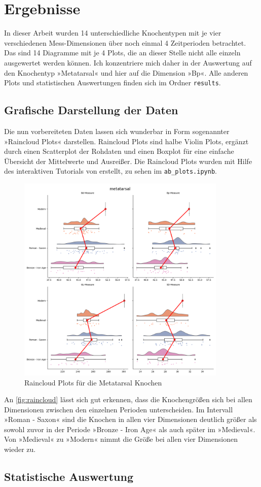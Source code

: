 \section{Ergebnisse}
In dieser Arbeit wurden 14 unterschiedliche Knochentypen mit je vier verschiedenen Mess-Dimensionen über noch einmal 4 Zeitperioden betrachtet. 
Das sind 14 Diagramme mit je 4 Plots, die an dieser Stelle nicht alle einzeln ausgewertet werden können. 
Ich konzentriere mich daher in der Auswertung auf den Knochentyp »Metatarsal« und hier auf die Dimension »Bp«.
Alle anderen Plots und statistischen Auswertungen finden sich im Ordner \texttt{results}. 

\subsection{Grafische Darstellung der Daten}
Die nun vorbereiteten Daten lassen sich wunderbar in Form sogenannter »Raincloud Plots«\cite{Allen2021} darstellen. Raincloud Plots sind halbe Violin Plots, ergänzt durch einen Scatterplot der Rohdaten und einen Boxplot für eine einfache Übersicht der Mittelwerte und Ausreißer. 
Die Raincloud Plots wurden mit Hilfe des interaktiven Tutorials von \cite{Allen2021} erstellt, zu sehen im \texttt{ab\_plots.ipynb}.

\begin{figure}[H]
    \centering
    \includegraphics[height=10cm]{plots/rainclouds/metatarsal.png}
    \caption{Raincloud Plots für die Metatarsal Knochen}
    \label{fig:raincloud}
\end{figure}

An \autoref{fig:raincloud} lässt sich gut erkennen, dass die Knochengrößen sich bei allen Dimensionen zwischen den einzelnen Perioden unterscheiden. 
Im Intervall »Roman - Saxon« sind die Knochen in allen vier Dimensionen deutlich größer als sowohl zuvor in der Periode »Bronze - Iron Age« als auch später im »Medieval«. 
Von »Medieval« zu »Modern« nimmt die Größe bei allen vier Dimensionen wieder zu.

\subsection{Statistische Auswertung}
